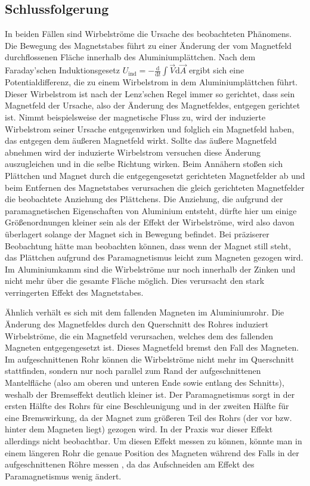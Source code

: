 \documentclass[
	a4paper,
	12pt,
	pagesize,
	ngerman
]{scrartcl}
\begin{document}
	\subsection{Schlussfolgerung}
	In beiden Fällen sind Wirbelströme die Ursache des beobachteten Phänomens.
	Die Bewegung des Magnetstabes führt zu einer Änderung der vom Magnetfeld durchflossenen Fläche innerhalb des Aluminiumplättchen. Nach dem Faraday'schen Induktionsgesetz $U_\text{ind}= - \frac{\text{d}}{\text{d}t} \int \vec{V} \text{d} \vec{A}$ ergibt sich eine Potentialdifferenz, die zu einem Wirbelstrom in dem Aluminiumplättchen führt. Dieser Wirbelstrom ist nach der Lenz'schen Regel immer so gerichtet, dass sein Magnetfeld der Ursache, also der Änderung des Magnetfeldes, entgegen gerichtet ist. %
	Nimmt beispielsweise der magnetische Fluss zu, wird der induzierte Wirbelstrom seiner Ursache entgegenwirken und folglich ein Magnetfeld haben, das entgegen dem äußeren Magnetfeld wirkt. Sollte das äußere Magnetfeld abnehmen wird der induzierte Wirbelstrom versuchen diese Änderung auszugleichen und in die selbe Richtung wirken. 
	Beim Annähern stoßen sich Plättchen und Magnet durch die entgegengesetzt gerichteten Magnetfelder ab und beim Entfernen des Magnetstabes verursachen die gleich gerichteten Magnetfelder die beobachtete Anziehung des Plättchens. 
	Die Anziehung, die aufgrund der paramagnetischen Eigenschaften von Aluminium entsteht, dürfte hier um einige Größenordnungen kleiner sein als der Effekt der Wirbelströme, wird also davon überlagert solange der Magnet sich in Bewegung befindet. Bei präziserer Beobachtung hätte man beobachten können, dass wenn der Magnet still steht, das Plättchen aufgrund des Paramagnetismus leicht zum Magneten gezogen wird.
	Im Aluminiumkamm sind die Wirbelströme nur noch innerhalb der Zinken und nicht mehr über die gesamte Fläche möglich. Dies verursacht den stark verringerten Effekt des Magnetstabes. \par
	Ähnlich verhält es sich mit dem fallenden Magneten im Aluminiumrohr. Die Änderung des Magnetfeldes durch den Querschnitt des Rohres induziert Wirbelströme, die ein Magnetfeld verursachen, welches dem des fallenden Magneten entgegengesetzt ist. Dieses Magnetfeld bremst den Fall des Magneten. Im aufgeschnittenen Rohr können die Wirbelströme nicht mehr im Querschnitt stattfinden, sondern nur noch parallel zum Rand der aufgeschnittenen Mantelfläche (also am oberen und unteren Ende sowie entlang des Schnitts), weshalb der Bremseffekt deutlich kleiner ist.
	Der Paramagnetismus sorgt in der ersten Hälfte des Rohrs für eine Beschleunigung und in der zweiten Hälfte für eine Bremswirkung, da der Magnet zum größeren Teil des Rohrs (der vor bzw. hinter dem Magneten liegt) gezogen wird. In der Praxis war dieser Effekt allerdings nicht beobachtbar. Um diesen Effekt messen zu können, könnte man in einem längeren Rohr die genaue Position des Magneten während des Falls in der aufgeschnittenen Röhre messen , da das Aufschneiden am Effekt des Paramagnetismus wenig ändert. \newline 
	
\end{document}
